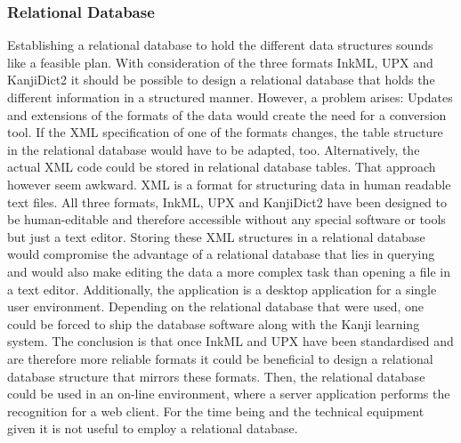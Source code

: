 \subsubsection{Relational Database}
\label{sec:hwre:relationaldatabase}

Establishing a relational database to hold the different data structures 
sounds like a feasible plan. With consideration of the three formats
InkML, UPX and KanjiDict2 it should be possible to design a relational database
that holds the different information in a structured manner.
However, a problem arises: Updates and extensions of the formats
of the data would create the need for a conversion tool.
If the XML specification of one of the formats changes, the table structure
in the relational database would have to be adapted, too.
Alternatively, the actual XML code could be stored in relational database 
tables. That approach however seem awkward. XML is a format for structuring
data in human readable text files. All three formats, InkML, UPX and KanjiDict2
have been designed to be human-editable and therefore accessible without
any special software or tools but just a text editor.
Storing these XML structures in a relational database would compromise the 
advantage of a relational database that lies in querying and would also
make editing the data a more complex task than opening a file in a text editor.
Additionally, the application is a desktop application for a single user 
environment. Depending on the relational database that were used,
one could be forced to ship the database software along with the Kanji 
learning system.
The conclusion is that once InkML and UPX have been standardised and are
therefore more reliable formats it could be beneficial to design a relational
database structure that mirrors these formats.
Then, the relational database could be used in an on-line environment, 
where a server application performs the recognition for a web client.
For the time being and the technical equipment given it is not 
useful to employ a relational database.



